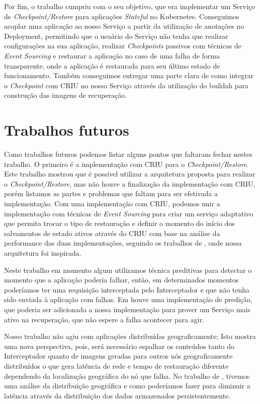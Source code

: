 	Por fim, o trabalho cumpriu com o seu objetivo, que era implementar um Serviço
	de \textit{Checkpoint/Restore} para aplicações \textit{Stateful} no Kubernetes.
	Conseguimos acoplar uma aplicação ao nosso Serviço a partir da utilização de
	anotações no Deployment, permitindo que o usuário do Serviço não tenha que
	realizar configurações na sua aplicação, realizar \textit{Checkpoints} passivos
	com técnicas de \textit{Event Sourcing} e restaurar a aplicação no caso de uma
	falha de forma transparente, onde a aplicação é restaurada para seu último estado
	de funcionamento. Também conseguimos entregar uma parte clara de como integrar o
	\textit{Checkpoint} com CRIU no nosso Serviço através da utilização do buildah
	para construção das imagens de recuperação.

\section{Trabalhos futuros}

Como trabalhos futuros podemos listar alguns pontos que faltaram fechar nestes trabalho.
O primeiro é a implementação com CRIU para o \textit{Checkpoint/Restore}. Este trabalho
mostrou que é possível utilizar a arquitetura proposta para realizar o
\textit{Checkpoint/Restore}, mas não houve a finalização da implementação com CRIU,
porém listamos as partes e problemas que faltam para ser efetivada a implementação. Com
uma implementação com CRIU, podemos unir a implementação com técnicas de
\textit{Event Sourcing} para criar um serviço adaptativo que permita trocar o tipo de
restauração e definir o momento do início dos salvamentos de estado ativos através do
CRIU com base na análise da performance das duas implementações, seguindo os trabalhos
de \cite{muller2022architecture}, onde nossa arquitetura foi inspirada. 

Neste trabalho em momento algum utilizamos técnica preditivas para detectar o momento
que a aplicação poderia falhar, então, em determinados momentos poderíamos ter uma
requisição interceptada pelo Interceptador e que não tenha sido enviada à aplicação
com falhas. Em \cite{tran2022proactive} houve uma implementação de predição, que poderia
ser adicionada a nossa implementação para prover um Serviço mais ativo na recuperação,
que não espere a falha acontecer para agir.

Nosso trabalho não agiu com aplicações distribuídas geograficamente; Isto mostra uma
nova perspectiva, pois, será necessário espalhar os conteúdos tanto do Interceptador
quanto de imagens geradas para outros nós geograficamente distribuídos o que gera
latência de rede e tempo de restauração diferente dependendo da localização geográfica
do nó que falha. No trabalho de \cite{vayghan2021kubernetes}, tivemos uma análise da
distribuição geográfica e como poderíamos fazer para diminuir a latência através da
distribuição dos dados armazenados persistentemente.

